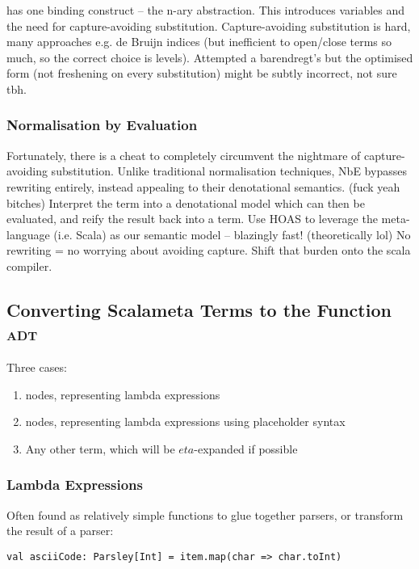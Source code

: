 \documentclass[../../main.tex]{subfiles}
\begin{document}
 has one binding construct -- the n-ary abstraction. This introduces variables and the need for capture-avoiding substitution.
Capture-avoiding substitution is hard, many approaches e.g. de Bruijn indices (but inefficient to open/close terms so much, so the correct choice is levels).
Attempted a barendregt's but the optimised form (not freshening on every substitution) might be subtly incorrect, not sure tbh.

\subsubsection{Normalisation by Evaluation}
Fortunately, there is a cheat to completely circumvent the nightmare of capture-avoiding substitution.
Unlike traditional normalisation techniques, NbE bypasses rewriting entirely, instead appealing to their denotational semantics. (fuck yeah bitches)
Interpret the term into a denotational model which can then be evaluated, and reify the result back into a term.
Use HOAS to leverage the meta-language (i.e. Scala) as our semantic model -- blazingly fast! (theoretically lol)
No rewriting = no worrying about avoiding capture.
Shift that burden onto the scala compiler.


\subsection{Converting Scalameta Terms to the Function \textsc{adt}}
Three cases:
\begin{enumerate}
    \item {} nodes, representing lambda expressions
    \item {} nodes, representing lambda expressions using placeholder syntax
    \item Any other term, which will be $eta$-expanded if possible
\end{enumerate}

\subsubsection{Lambda Expressions}
Often found as relatively simple functions to glue together parsers, or transform the result of a parser:
\begin{verbatim}
val asciiCode: Parsley[Int] = item.map(char => char.toInt)
\end{verbatim}
\end{document}
